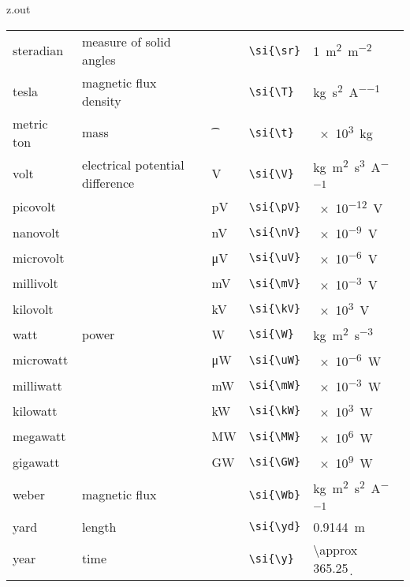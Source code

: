 \begin{VerbatimOut}{z.out}
{\begin{longtable}{@{}P{1.4in}P{1in}llP{1.8in}@{}}
    \vsp
    steradian&
      measure of solid angles&
      \si{\sr}&
      \verb+\si{\sr}+&
      \SI{1}{\m\squared\per\m\squared}\\
    \vsp
    tesla&
      magnetic flux density&
      \si{\T}&
      \verb+\si{\T}+&
      \si{\kg\per\s\squared\per\A}\\
    \vsp
    metric ton&
      mass&
      \si{\t}&
      \verb+\si{\t}+&
      \SI{e3}{\kg}\\
    \vsp
    volt&
      electrical potential difference&
      \si{\V}&
      \verb+\si{\V}+&
      \si{\kg\m\squared\per\s\cubed\per\A}\\
    \quad picovolt&
      \ditto&
      \si{\pV}&
      \verb+\si{\pV}+&
      \SI{e-12}{\V}\\
    \quad nanovolt&
      \ditto&
      \si{\nV}&
      \verb+\si{\nV}+&
      \SI{e-9}{\V}\\
    \quad microvolt&
      \ditto&
      \si{\uV}&
      \verb+\si{\uV}+&
      \SI{e-6}{\V}\\
    \quad millivolt&
      \ditto&
      \si{\mV}&
      \verb+\si{\mV}+&
      \SI{e-3}{\V}\\
    \quad kilovolt&
      \ditto&
      \si{\kV}&
      \verb+\si{\kV}+&
      \SI{e3}{\V}\\
    \vsp
    watt&
      power&
      \si{\W}&
      \verb+\si{\W}+&
      \si{\kg\m\squared\per\s\cubed}\\
    \quad microwatt&
      \ditto&
      \si{\uW}&
      \verb+\si{\uW}+&
      \SI{e-6}{\W}\\
    \quad milliwatt&
      \ditto&
      \si{\mW}&
      \verb+\si{\mW}+&
      \SI{e-3}{\W}\\
    \quad kilowatt&
      \ditto&
      \si{\kW}&
      \verb+\si{\kW}+&
      \SI{e3}{\W}\\
    \quad megawatt&
      \ditto&
      \si{\MW}&
      \verb+\si{\MW}+&
      \SI{e6}{\W}\\
    \quad gigawatt&
      \ditto&
      \si{\GW}&
      \verb+\si{\GW}+&
      \SI{e9}{\W}\\
    \vsp
    weber&
      magnetic flux&
      \si{\Wb}&
      \verb+\si{\Wb}+&
      \si{\kg\m\squared\per\s\squared\per\A}\\
    \vsp
    yard&
      length&
      \si{\yd}&
      \verb+\si{\yd}+&
      \SI{.9144}{\m}\\  %
    \vsp
    year&
      time&
      \si{\y}&
      \verb+\si{\y}+&
      \SI{\approx 365.25}{\d}\\  %
  \end{longtable}
}
\end{VerbatimOut}


